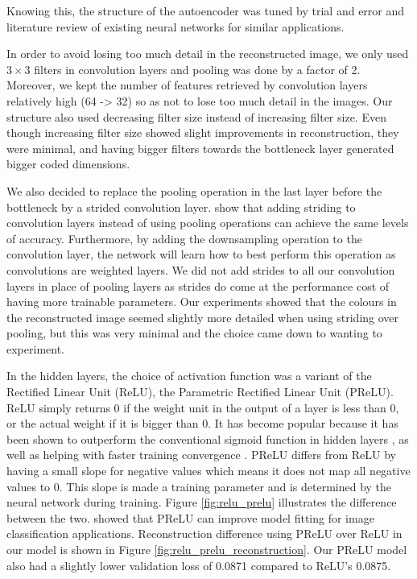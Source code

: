 Knowing this, the structure of the autoencoder was tuned by trial and error and literature review of existing neural networks for similar applications.

In order to avoid losing too much detail in the reconstructed image, we only used $3\times3$ filters in convolution layers and pooling was done by a factor of 2. Moreover, we kept the number of features retrieved by convolution layers relatively high (64 -> 32) so as not to lose too much detail in the images. Our structure also used decreasing filter size instead of increasing filter size. Even though increasing filter size showed slight improvements in reconstruction, they were minimal, and having bigger filters towards the bottleneck layer generated bigger coded dimensions.

We also decided to replace the pooling operation in the last layer before the bottleneck by a strided convolution layer. \citet{springenberg_striving_2014} show that adding striding to convolution layers instead of using pooling operations can achieve the same levels of accuracy. Furthermore, by adding the downsampling operation to the convolution layer, the network will learn how to best perform this operation as convolutions are weighted layers. We did not add strides to all our convolution layers in place of pooling layers as strides do come at the performance cost of having more trainable parameters. Our experiments showed that the colours in the reconstructed image seemed slightly more detailed when using striding over pooling, but this was very minimal and the choice came down to wanting to experiment.

In the hidden layers, the choice of activation function was a variant of the Rectified Linear Unit (ReLU), the Parametric Rectified Linear Unit (PReLU). ReLU simply returns 0 if the weight unit in the output of a layer is less than 0, or the actual weight if it is bigger than 0. It has become popular because it has been shown to outperform the conventional sigmoid function in hidden layers \citep{hinton_relu, glorot2011}, as well as helping with faster training convergence \citep{krizhevsky_imagenet_2012}. PReLU differs from ReLU by having a small slope for negative values which means it does not map all negative values to 0. This slope is made a training parameter and is determined by the neural network during training. Figure \ref{fig:relu_prelu} illustrates the difference between the two. \citet{he_2015} showed that PReLU can improve model fitting for image classification applications. Reconstruction difference using PReLU over ReLU in our model is shown in Figure \ref{fig:relu_prelu_reconstruction}. Our PReLU model also had a slightly lower validation loss of 0.0871 compared to ReLU's 0.0875. 

